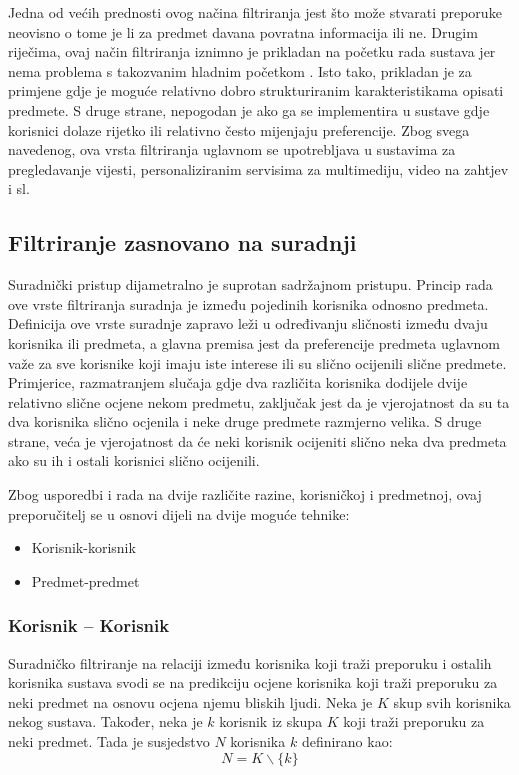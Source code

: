 \documentclass[times, utf8, diplomski, numeric]{fer}
\begin{document}
Jedna od većih prednosti ovog načina filtriranja jest što može stvarati
preporuke neovisno o tome je li za predmet davana povratna informacija ili ne.
Drugim riječima, ovaj način filtriranja iznimno je prikladan na početku rada
sustava jer nema problema s takozvanim hladnim početkom .
Isto tako, prikladan je za primjene gdje je moguće relativno dobro strukturiranim
karakteristikama opisati predmete. S druge strane, nepogodan je ako ga
se implementira u sustave gdje korisnici dolaze rijetko ili relativno često
mijenjaju preferencije. Zbog svega navedenog, ova vrsta filtriranja uglavnom se
upotrebljava u sustavima za pregledavanje vijesti, personaliziranim servisima za
multimediju, video na zahtjev i sl.

\subsection{Filtriranje zasnovano na suradnji}
Suradnički pristup dijametralno je suprotan sadržajnom pristupu. Princip rada
ove vrste filtriranja suradnja je između pojedinih korisnika odnosno predmeta.
Definicija ove vrste suradnje zapravo leži u određivanju sličnosti između dvaju
korisnika ili predmeta, a glavna premisa jest da preferencije predmeta uglavnom
važe za sve korisnike koji imaju iste interese ili su slično ocijenili slične
predmete. Primjerice, razmatranjem slučaja gdje dva različita korisnika dodijele
dvije relativno slične ocjene nekom predmetu, zaključak jest da je vjerojatnost
da su ta dva korisnika slično ocjenila i neke druge predmete razmjerno velika. S
druge strane, veća je vjerojatnost da će neki korisnik ocijeniti slično neka dva
predmeta ako su ih i ostali korisnici slično ocijenili.

Zbog usporedbi i rada na dvije različite razine, korisničkoj i predmetnoj, ovaj
preporučitelj se u osnovi dijeli na dvije moguće tehnike:
\begin{itemize}
  \item Korisnik-korisnik 
  \item Predmet-predmet 
\end{itemize}

\subsubsection{Korisnik -- Korisnik}
Suradničko filtriranje na relaciji između korisnika koji traži preporuku i
ostalih korisnika sustava svodi se na predikciju ocjene korisnika koji traži
preporuku za neki predmet na osnovu ocjena njemu bliskih ljudi. Neka je $K$ skup
svih korisnika nekog sustava. Također, neka je $k$ korisnik iz skupa $K$ koji
traži preporuku za neki predmet. Tada je susjedstvo $N$ korisnika $k$
definirano kao:
\begin{equation}
\label{eq:susjedstvo}
	N = K \backslash \{k\}
\end{equation}
\end{document}
